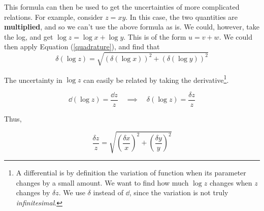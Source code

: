 This formula can then be used to get the uncertainties of more complicated relations. For example, consider $z = xy$. In this case, the two quantities are \textbf{multiplied}, and so we can't use the above formula as is. We could, however, take the log, and get $\log{z} = \log{x} + \log{y}$. This is of the form $u = v + w$. We could then apply Equation (\ref{quadrature}), and find that $$\delta \left(\log{z}\right) = \sqrt{\left(\delta \left(\log{x}\right)\right)^2 + \left(\delta \left(\log{y}\right)\right)^2}$$

The uncertainty in $\log{z}$ can easily be related by taking the derivative\footnote{A differential is by definition the variation of function when its parameter changes by a small amount. We want to find how much $\log{z}$ changes when $z$ changes by $\delta z$. We use $\delta$ instead of $\dd$, since the variation is not truly \textit{infinitesimal}.}.

\begin{equation*}
    \dd({\log{z}}) = \frac{\dd z}{z} \quad \implies \quad \delta (\log{z}) = \frac{\delta z}{z}
\end{equation*}

Thus, 

\begin{equation}
    \frac{\delta z}{z} = \sqrt{\left(\frac{\delta x}{x}\right)^2 + \left(\frac{\delta y}{y}\right)^2}
\end{equation}

